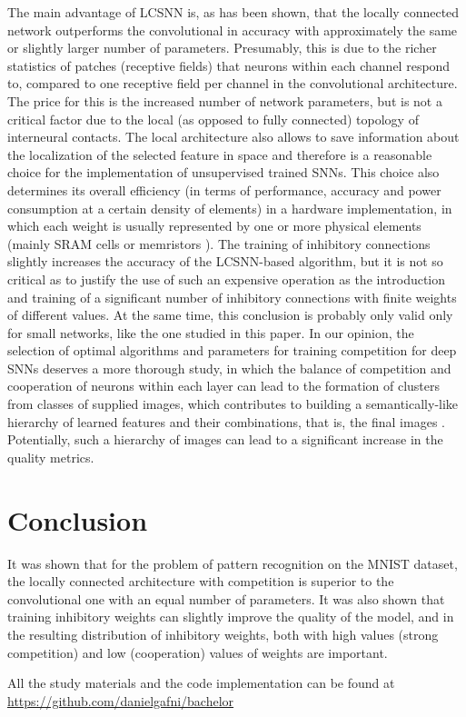 \documentclass[a4paper]{article}
\begin{document}
The main advantage of LCSNN is, as has been shown, that the locally connected network outperforms the convolutional in accuracy with approximately the same or slightly larger number of parameters. Presumably, this is due to the richer statistics of patches (receptive fields) that neurons within each channel respond to, compared to one receptive field per channel in the convolutional architecture. The price for this is the increased number of network parameters, but is not a critical factor due to the local (as opposed to fully connected) topology of interneural contacts. The local architecture also allows to save information about the localization of the selected feature in space and therefore is a reasonable choice for the implementation of unsupervised trained SNNs. This choice also determines its overall efficiency (in terms of performance, accuracy and power consumption at a certain density of elements) in a hardware implementation, in which each weight is usually represented by one or more physical elements (mainly SRAM cells \cite{TrueNorth, Loihi} or memristors \cite{Li_2018}).
The training of inhibitory connections slightly increases the accuracy of the LCSNN-based algorithm, but it is not so critical as to justify the use of such an expensive operation as the introduction and training of a significant number of inhibitory connections with finite weights of different values. At the same time, this conclusion is probably only valid only for small networks, like the one studied in this paper. In our opinion, the selection of optimal algorithms and parameters for training competition for deep SNNs deserves a more thorough study, in which the balance of competition and cooperation of neurons within each layer can lead to the formation of clusters from classes of supplied images, which contributes to building a semantically-like hierarchy of learned features and their combinations, that is, the final images \cite{10.1007/978-3-030-30425-6_30}. Potentially, such a hierarchy of images can lead to a significant increase in the quality metrics.

\clearpage
{}
\section*{Conclusion}
It was shown that for the problem of pattern recognition on the MNIST dataset, the locally connected architecture with competition is superior to the convolutional one with an equal number of parameters.
It was also shown that training inhibitory weights can slightly improve the quality of the model, and in the resulting distribution of inhibitory weights, both with high values (strong competition) and low (cooperation) values of weights are important.


\printbibliography[sorting=none,heading=bibintoc,type=article,title={References}]
 
\begin{center}
All the study materials and the code implementation can be found at\\
\href{https://github.com/danielgafni/bachelor}{https://github.com/danielgafni/bachelor} 
\end{center}
\end{document}

